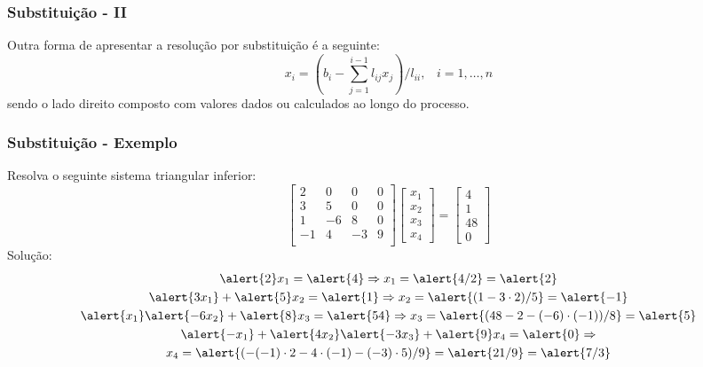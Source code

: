 \documentclass{beamer}
\theoremstyle{mystyle}
\begin{document}
\begin{frame}
	\frametitle{Substituição - II}
	Outra forma de apresentar a resolução por substituição é a seguinte:
	\begin{equation*}
		x_{i} = \left(b_{i} - \sum_{j=1}^{i-1} l_{ij} x_{j} \right) / l_{ii}, \;\;\; i = 1,\ldots, n
	\end{equation*}
	sendo o lado direito composto com valores dados ou calculados ao longo do processo.
\end{frame}

\begin{frame}
	\frametitle{Substituição - Exemplo}
	Resolva o seguinte sistema triangular inferior:
	\begin{equation*}
		\left[
		\begin{array}{cccc}
			2 & 0 & 0 & 0 \\
			3 & 5 & 0 & 0 \\
			1 & -6 & 8 & 0 \\
			-1 & 4 & -3 & 9 \\
		\end{array}
		\right] 
		\begin{bmatrix} x_{1} \\ x_{2} \\ x_{3} \\ x_{4} \end{bmatrix}
		=
		\begin{bmatrix} 4 \\ 1 \\ 48 \\ 0 \end{bmatrix}
	\end{equation*}
	\pause 
	Solução:
	\begin{gather*}
		\alert{2}x_{1} = \alert{4} \Rightarrow x_{1} = \alert{4/2} = \alert{2}\\
		\alert{3x_{1}} + \alert{5}x_{2} = \alert{1} \Rightarrow x_{2} = \alert{(1 - 3\cdot2)/5} = \alert{-1}\\
		\alert{x_{1}} \alert{- 6x_{2}} + \alert{8}x_{3} = \alert{54} \Rightarrow x_{3} = \alert{(48 - 2 - (-6)\cdot (-1))/8} = \alert{5}\\
		\alert{-x_{1}} + \alert{4x_{2}} \alert{-3x_{3}} + \alert{9}x_{4} = \alert{0} \Rightarrow\\
		x_{4} = \alert{(-(-1)\cdot2 - 4\cdot(-1)  - (-3)\cdot 5)/9} = \alert{21/9} = \alert{7/3}
	\end{gather*}
\end{frame}
\end{document}
